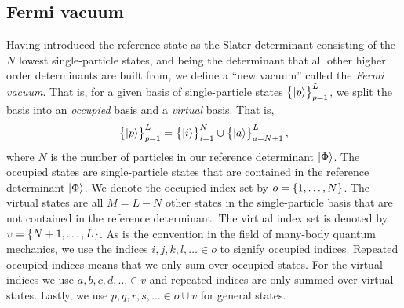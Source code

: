         \subsection{Fermi vacuum}
            \label{subsec:fermi-vacuum}
            Having introduced the reference state as the Slater determinant
            consisting of the $N$ lowest single-particle states, and being the
            determinant that all other higher order determinants are built from,
            we define a ``new vacuum'' called the \emph{Fermi vacuum}.
            That is, for a given basis of single-particle states
            $\left\{ \ket{p} \right\}_{p = 1}^{L}$, we split the basis into an
            \emph{occupied} basis and a \emph{virtual} basis.
            That is,
            \begin{align}
                \left\{ \ket{p} \right\}_{p = 1}^{L}
                = \left\{ \ket{i} \right\}_{i = 1}^{N}
                \cup
                \left\{ \ket{a} \right\}_{a = N + 1}^{L},
            \end{align}
            where $N$ is the number of particles in our reference determinant
            $\ket{\Phi}$.
            The occupied states are single-particle states that are contained in
            the reference determinant $\ket{\Phi}$.
            We denote the occupied index set by $o = \left\{ 1, \dots, N \right\}$.
            The virtual states are all $M = L - N$ other states in the
            single-particle basis that are not contained in the reference
            determinant.
            The virtual index set is denoted by $v = \left\{ N + 1, \dots, L \right\}$.
            As is the convention in the field of many-body quantum mechanics, we
            use the indices $i, j, k, l, \dots \in o$ to signify occupied
            indices.
            Repeated occupied indices means that we only sum over occupied
            states.
            For the virtual indices we use $a, b, c, d, \dots \in v$ and
            repeated indices are only summed over virtual states.
            Lastly, we use $p, q, r, s, \dots \in o \cup v$ for general states.

